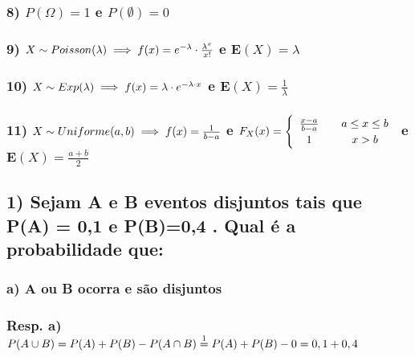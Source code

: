 \documentclass[english]{article}
\begin{document}
\subsubsection*{8) $P(\Omega)=1$ e $P(\emptyset)=0$}


\subsubsection*{9) $X\sim Poisson(\lambda)\protect\implies f(x)=e^{-\lambda}\cdot\frac{\lambda^{x}}{x!}$
e $\mathbf{E}(X)=\lambda$}


\subsubsection*{10) $X\sim Exp(\lambda)\protect\implies f(x)=\lambda\cdot e^{-\lambda\cdot x}$
e $\mathbf{E}(X)=\frac{1}{\lambda}$}


\subsubsection*{11) $X\sim Uniforme(a,b)\protect\implies f(x)=\frac{1}{b-a}$ e $F_{X}(x)=\protect\begin{cases}
\protect\begin{array}{c}
\frac{x-a}{b-a}\protect\\
1
\protect\end{array} & \protect\begin{array}{c}
a\leq x\leq b\protect\\
x>b
\protect\end{array}\protect\end{cases}$ e $\mathbf{E}(X)=\frac{a+b}{2}$}

\textcompwordmark{}


\subsection*{\textmd{1) Sejam A e B eventos disjuntos tais que P(A) = 0,1 e P(B)=0,4
. Qual é a probabilidade que:}}


\subsubsection*{\textmd{a) A ou B ocorra e são disjuntos}}


\subsubsection*{\textmd{Resp. a) $P(A\cup B)\protect\overset{}{=}P(A)+P(B)-P(A\cap B)\protect\overset{1}{=}P(A)+P(B)-0=0,1+0,4$}}
\end{document}
